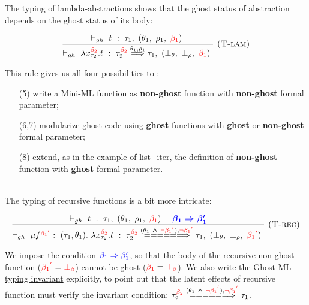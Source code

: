 \documentclass[a4paper,11pt,oneside]{article}
\theoremstyle{plain}
\newcommand{\rouge}[1]{\textcolor{red}{#1}}
\newcommand{\bwedge}{\boldsymbol{~\wedge~}}
\newcommand{\ghosttyping}[6]{\vdash_{gh}~#1~:~#2,~(#3,~#4,~\rouge{#5})~\textcolor{blue}{\boldsymbol{#6}}}
\newcommand{\bth}{\bot_\theta}
\newcommand{\brh}{\bot_\rho}
\newcommand{\gba}[1]{\beta_{#1}}
\newcommand{\gbb}{\bot_\beta}
\newcommand{\gbt}{\top_\beta}
\newcommand{\gbra}[1]{\textcolor{red}{\gba{#1}}}
\newcommand{\gbbr}{\textcolor{red}{\gbb}}
\newcommand{\gbtr}{\textcolor{red}{\gbt}}
\newcommand{\gbran}[1]{\textcolor{red}{\neg\gba{#1}}}
\begin{document}
The typing of lambda-abstractions shows that the ghost status of abstraction depends on the ghost status of its body:
\begin{footnotesize}	
\begin{displaymath}
\begin{array}{l}
\dfrac
	{\ghosttyping
		{t}
		{\tau_1}
		{\theta_1}
		{\rho_1}
		{\gbra{1}}
		{}}
	{\ghosttyping
		{\lambda x^{\gbra{2}}_{\tau_2} . t}
		{\tau_{2}^{\gbra{2}} \stackrel{\theta_1, \rho_1}{\Longrightarrow} \tau_1}
		{\bth}
		{\brh}
		{\gbra{1}}
		{}}
	{\textsc{  (T-lam)}}
\end{array}	
\end{displaymath}
\end{footnotesize}	
This rule gives us all four possibilities to :
\begin{itemize}
\item[(5)] write a Mini-ML function as \textbf{non-ghost} function with \textbf{non-ghost} formal parameter; 

\item[(6,7)] modularize ghost code using \textbf{ghost} functions with \textbf{ghost} or \textbf{non-ghost} formal parameter; 

\item[(8)] extend, as in the \hyperlink{list-iter}{example of list\_iter}, the definition of \textbf{non-ghost} function with \textbf{ghost} formal parameter.
\end{itemize}
~\\
The typing of recursive functions is a bit more intricate:
\begin{footnotesize}	
\begin{displaymath}
\begin{array}{l}
\dfrac
	{\ghosttyping
		{t}
		{\tau_1}
		{\theta_1}
		{\rho_1}
		{\gbra{1}}
		{\quad \gba{1} \Rightarrow \beta_1'}}
	{\ghosttyping
		{\mu f^{\gbra{1}^{\rouge{'}}}:~(\tau_1, \theta_1).~\lambda x^{\gbra{2}}_{\tau_2}. t} 
		{\tau_{2}^{\gbra{2}} \stackrel{(\theta_1 \bwedge \gbran{1}^{\rouge{'}}), \gbran{1}^{\rouge{'}}}{=======>} \tau_1}
		{\bth}
		{\brh}
		{\gbra{1}^{\rouge{'}}}
		{}}
	{\textsc{  (T-rec)}}
\end{array}	
\end{displaymath}
\end{footnotesize}
We impose the condition $\textcolor{blue}{\gba{1} \Rightarrow \beta_1'}$, so that the body of the recursive non-ghost function ($\gbra{1}^{\rouge{'}} = \gbbr$) cannot be ghost ($\gbra{1} = \gbtr$).   
We also write the \hyperlink{gh-typ-inv}{Ghost-ML typing invariant} explicitly, to point out that the latent effects of recursive function must verify the invariant condition:
${\tau_{2}^{\gbra{2}} \stackrel{(\theta_1 \bwedge \gbran{1}^{\rouge{'}}), \gbran{1}^{\rouge{'}}}{=======>} \tau_1}$.
\end{document}
